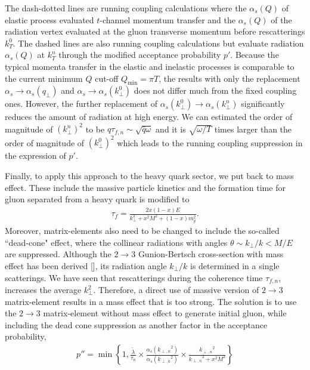\documentclass[aps, prc, reprint, amsmath, groupedaddress, nofootinbib]{revtex4-1}
\begin{document}
The dash-dotted lines are running coupling calculations where the $\alpha_s(Q)$ of elastic process evaluated $t$-channel momentum transfer and the $\alpha_s(Q)$ of the radiation vertex evaluated at the gluon transverse momentum before rescatterings $k_T^0$.
The dashed lines are also running coupling calculations but evaluate radiation $\alpha_s(Q)$ at $k_T^n$ through the modified acceptance probability $p'$.
Because the typical momenta transfer in the elastic and inelastic processes is comparable to the current minimum $Q$ cut-off $Q_{\min} = \pi T$, the results with only the replacement $\alpha_s\rightarrow\alpha_s(q_\perp)$ and $\alpha_s\rightarrow\alpha_s(k_\perp^0)$ does not differ much from the fixed coupling ones.
However, the further replacement of $\alpha_s(k_\perp^0)\rightarrow\alpha_s(k_\perp^n)$ significantly reduces the amount of radiation at high energy.
We can estimated the order of magnitude of $\left(k_\perp^n\right)^2$ to be $\hat{q}\tau_{f,n} \sim \sqrt{\hat{q}\omega}$ and it is $\sqrt{\omega/T}$ times larger than the order of magnitude of $\left(k_\perp^0\right)^2$ which leads to the running coupling suppression in the expression of $p'$.

Finally, to apply this approach to the heavy quark sector, we put back to mass effect. 
These include the massive particle kinetics and the formation time for gluon separated from a heavy quark is modified to
\begin{eqnarray}
\tau_{f} = \frac{2x(1-x)E}{k_\perp^2 + x^2M^2 + (1-x)m_g^2}.
\end{eqnarray}
Moreover, matrix-elements also need to be changed to include the so-called ``dead-cone" effect, where the collinear radiations with angles $\theta \sim k_\perp/k < M/E$ are suppressed. 
Although the $2\rightarrow3$ Gunion-Bertsch cross-section with mass effect has been derived [], its radiation angle $k_\perp/k$ is determined in a single scatterings.
We have seen that rescatterings during the coherence time $\tau_{f,n}$, increases the average $k_{\perp}^2$. Therefore, a direct use of massive version of $2\rightarrow3$ matrix-element results in a mass effect that is too strong.
The solution is to use the $2\rightarrow3$ matrix-element without mass effect to generate initial gluon, while including the dead cone suppression as another factor in the acceptance probability,
\begin{eqnarray}
p'' = \min\left\{1, \frac{\tilde{\lambda}}{\tau_n}\times\frac{\alpha_s({k_{\perp,n}}^2)}{\alpha_s({k_{\perp,0}}^2)} \times \frac{{k_{\perp,n}}^2}{{k_{\perp,n}}^2+x^2 M^2}\right\}
\end{eqnarray}
\end{document}
